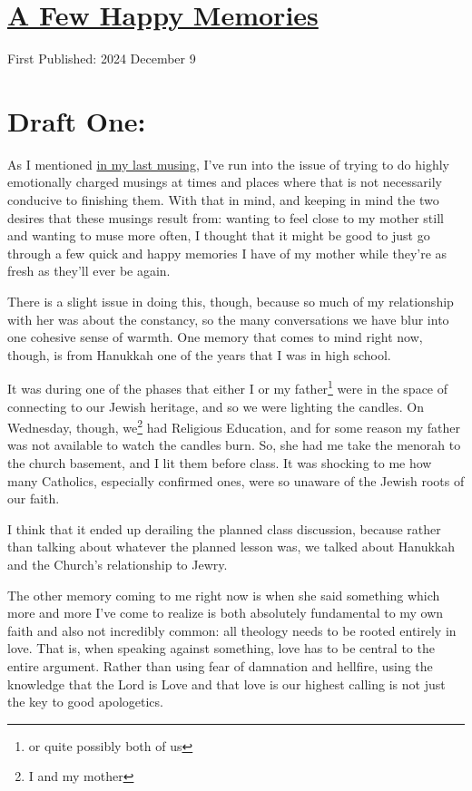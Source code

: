 \documentclass[12pt]{article}[titlepage]
\renewcommand{\,}{\textsuperscript{,}}
\begin{document}
\doublespacing
\section{\href{quick-happy-memories.html}{A Few Happy Memories}}
First Published: 2024 December 9

\section{Draft One:}
As I mentioned \href{reflection\-2024b.html}{in my last musing}, I've run into the issue of trying to do highly emotionally charged musings at times and places where that is not necessarily conducive to finishing them.  
With that in mind, and keeping in mind the two desires that these musings result from: wanting to feel close to my mother still and wanting to muse more often, I thought that it might be good to just go through a few quick and happy memories I have of my mother while they're as fresh as they'll ever be again.

There is a slight issue in doing this, though, because so much of my relationship with her was about the constancy, so the many conversations we have blur into one cohesive sense of warmth.  
One memory that comes to mind right now, though, is from Hanukkah one of the years that I was in high school.

It was during one of the phases that either I or my father\footnote{or quite possibly both of us} were in the space of connecting to our Jewish heritage, and so we were lighting the candles.  
On Wednesday, though, we\footnote{I and my mother} had Religious Education, and for some reason my father was not available to watch the candles burn.  
So, she had me take the menorah to the church basement, and I lit them before class.  
It was shocking to me how many Catholics, especially confirmed ones, were so unaware of the Jewish roots of our faith.

I think that it ended up derailing the planned class discussion, because rather than talking about whatever the planned lesson was, we talked about Hanukkah and the Church's relationship to Jewry.

The other memory coming to me right now is when she said something which more and more I've come to realize is both absolutely fundamental to my own faith and also not incredibly common: all theology needs to be rooted entirely in love.  
That is, when speaking against something, love has to be central to the entire argument.  
Rather than using fear of damnation and hellfire, using the knowledge that the Lord is Love and that love is our highest calling is not just the key to good apologetics.
\end{document}
